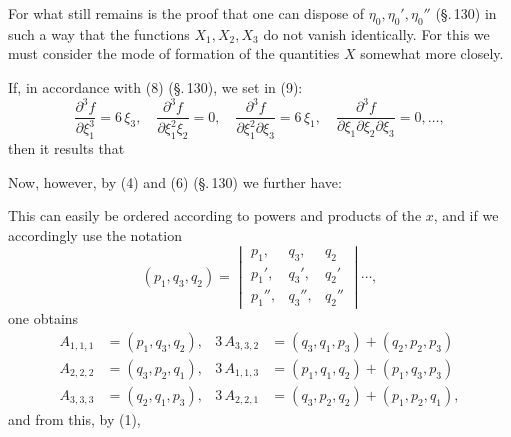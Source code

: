 For what still remains is the proof that one can dispose of $\eta_0, \eta_0', \eta_0''$ (§.\,130) in such a way that the functions $X_1, X_2, X_3$ do not vanish identically. For this we must consider the mode of formation of the quantities $X$ somewhat more closely.

If, in accordance with (8) (§.\,130), we set in (9):
\[
\frac{\partial^3 f}{\partial \xi_1^3} = 6\,\xi_3, \quad \frac{\partial^3 f}{\partial \xi_1^2 \xi_2} = 0, \quad \frac{\partial^3 f}{\partial \xi_1^2 \partial \xi_3} = 6\,\xi_1, \quad \frac{\partial^3 f}{\partial \xi_1 \partial \xi_2 \partial \xi_3} = 0, \dots, %
\]
then it results that


Now, however, by (4) and (6) (§.\,130) we further have:


This can easily be ordered according to powers and products of the $x$, and if we accordingly use the notation
\[
(p_1, q_3, q_2) =
\begin{vmatrix}
p_1, & q_3, & q_2 \\
p_1', & q_3', & q_2' \\
p_1'', & q_3'', & q_2''
\end{vmatrix} \cdots,
\]
one obtains
\[
\begin{aligned}
A_{1,1,1} &= (p_1, q_3, q_2), & 3\,A_{3,3,2} &= (q_3, q_1, p_3) + (q_2, p_2, p_3) \\
A_{2,2,2} &= (q_3, p_2, q_1), & 3\,A_{1,1,3} &= (p_1, q_1, q_2) + (p_1, q_3, p_3) \\
A_{3,3,3} &= (q_2, q_1, p_3), & 3\,A_{2,2,1} &= (q_3, p_2, q_2) + (p_1, p_2, q_1),
\end{aligned}
\]
and from this, by (1),

